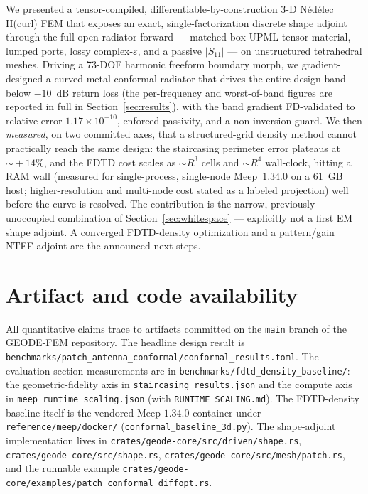 \documentclass{anvil-paper}
\begin{document}
We presented a tensor-compiled, differentiable-by-construction 3-D N\'ed\'elec
H(curl) FEM that exposes an exact, single-factorization discrete shape adjoint
through the full open-radiator forward --- matched box-UPML tensor material,
lumped ports, lossy complex-$\varepsilon$, and a passive $|S_{11}|$ --- on
unstructured tetrahedral meshes. Driving a 73-DOF harmonic freeform boundary
morph, we gradient-designed a curved-metal conformal radiator that drives the
entire design band below $-10$~dB return loss (the per-frequency and
worst-of-band figures are reported in full in Section~\ref{sec:results}), with
the band gradient FD-validated to relative error
$1.17\times10^{-10}$, enforced passivity, and a non-inversion guard. We then
\emph{measured}, on two committed axes, that a structured-grid density method
cannot practically reach the same design: the staircasing perimeter error
plateaus at $\sim\!+14\%$, and the FDTD cost scales as $\sim\!R^3$ cells and
$\sim\!R^4$ wall-clock, hitting a RAM wall (measured for single-process,
single-node Meep~$1.34.0$ on a $61$~GB host; higher-resolution and multi-node
cost stated as a labeled projection) well before the curve is resolved.
The contribution is the narrow, previously-unoccupied combination of
Section~\ref{sec:whitespace} --- explicitly not a first EM shape adjoint. A
converged FDTD-density optimization and a pattern/gain NTFF adjoint are the
announced next steps.

\section*{Artifact and code availability}
\label{sec:availability}
All quantitative claims trace to artifacts committed on the \texttt{main} branch
of the GEODE-FEM repository. The headline design result is
\texttt{benchmarks/patch\_antenna\_conformal/conformal\_results.toml}. The
evaluation-section measurements are in \texttt{benchmarks/fdtd\_density\_baseline/}:
the geometric-fidelity axis in \texttt{staircasing\_results.json} and the compute
axis in \texttt{meep\_runtime\_scaling.json} (with \texttt{RUNTIME\_SCALING.md}).
The FDTD-density baseline itself is the vendored Meep $1.34.0$ container under
\texttt{reference/meep/docker/} (\texttt{conformal\_baseline\_3d.py}). The
shape-adjoint implementation lives in
\texttt{crates/geode-core/src/driven/shape.rs},
\texttt{crates/geode-core/src/shape.rs},
\texttt{crates/geode-core/src/mesh/patch.rs}, and the runnable example
\texttt{crates/geode-core/examples/patch\_conformal\_diffopt.rs}.



\end{document}
